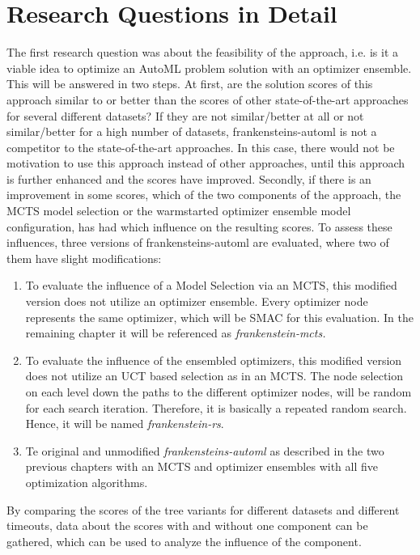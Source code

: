 \section{Research Questions in Detail}
The first research question was about the feasibility of the approach, i.e. is it a viable idea to optimize an AutoML problem solution with an optimizer ensemble.
This will be answered in two steps.\newline
At first, are the solution scores of this approach similar to or better than the scores of other state-of-the-art approaches for several different datasets?
If they are not similar/better at all or not similar/better for a high number of datasets, frankensteins-automl is not a competitor to the state-of-the-art approaches.
In this case, there would not be motivation to use this approach instead of other approaches, until this approach is further enhanced and the scores have improved.\newline
Secondly, if there is an improvement in some scores, which of the two components of the approach, the MCTS model selection or the warmstarted optimizer ensemble model configuration, has had which influence on the resulting scores.
To assess these influences, three versions of frankensteins-automl are evaluated, where two of them have slight modifications:
\begin{enumerate}
    \item To evaluate the influence of a Model Selection via an MCTS, this modified version does not utilize an optimizer ensemble.
    Every optimizer node represents the same optimizer, which will be SMAC for this evaluation.
    In the remaining chapter it will be referenced as \textit{frankenstein-mcts.}
    \item To evaluate the influence of the ensembled optimizers, this modified version does not utilize an UCT based selection as in an MCTS.
    The node selection on each level down the paths to the different optimizer nodes, will be random for each search iteration.
    Therefore, it is basically a repeated random search.
    Hence, it will be named \textit{frankenstein-rs}.
    \item Te original and unmodified \textit{frankensteins-automl} as described in the two previous chapters with an MCTS and optimizer ensembles with all five optimization algorithms.
\end{enumerate}
By comparing the scores of the tree variants for different datasets and different timeouts, data about the scores with and without one component can be gathered, which can be used to analyze the influence of the component.

